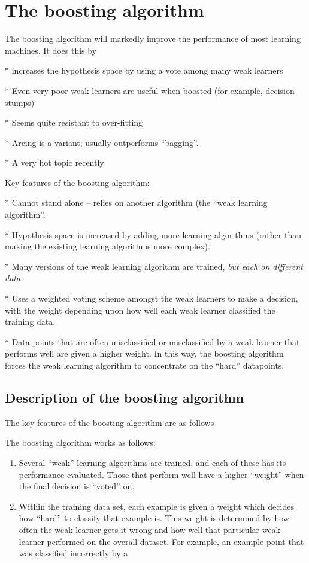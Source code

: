 \section{The boosting algorithm}

The boosting algorithm will markedly improve the performance of most
learning machines.  It does this by 

* increases the hypothesis space by using a vote among many weak
  learners

* Even very poor weak learners are useful when boosted (for example,
  decision stumps)

* Seems quite resistant to over-fitting

* Arcing is a variant; usually outperforms ``bagging''.

* A very hot topic recently


Key features of the boosting algorithm:

* Cannot stand alone -- relies on another algorithm (the ``weak
  learning algorithm''.

* Hypothesis space is increased by adding more learning algorithms
  (rather than making the existing learning algorithms more complex).

* Many versions of the weak learning algorithm are trained, \emph{but
  each on different data}.

* Uses a weighted voting scheme amongst the weak learners to make a
  decision, with the weight depending upon how well each weak learner
  classified the training data.

* Data points that are often misclassified or misclassified by a weak
  learner that performs well are given a higher weight.  In this way,
  the boosting algorithm forces the weak learning algorithm to
  concentrate on the ``hard'' datapoints.


\subsection{Description of the boosting algorithm}



The key features of the boosting algorithm are as follows

The boosting algorithm works as follows:

\begin{enumerate}

\item	Several ``weak'' learning algorithms are trained, and each of
	these has its performance evaluated.  Those that perform well
	have a higher ``weight'' when the final decision is ``voted''
	on.

\item	Within the training data set, each example is given a weight
	which decides how ``hard'' to classify that example is.  This
	weight is determined by how often the weak learner gets it
	wrong and how well that particular weak learner performed on
	the overall dataset.  For example, an example point that was
	classified incorrectly by a 

\end{enumerate}

